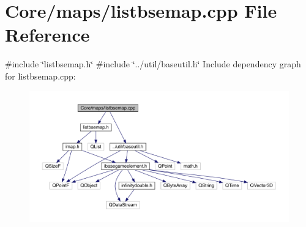 \hypertarget{a00062}{}\section{Core/maps/listbsemap.cpp File Reference}
\label{a00062}
{\ttfamily \#include \char`\"{}listbsemap.\+h\char`\"{}}\newline
{\ttfamily \#include \char`\"{}../util/baseutil.\+h\char`\"{}}\newline
Include dependency graph for listbsemap.\+cpp\+:
\nopagebreak
\begin{figure}[H]
\begin{center}
\leavevmode
\includegraphics[width=350pt]{d1/d6f/a00063}
\end{center}
\end{figure}
